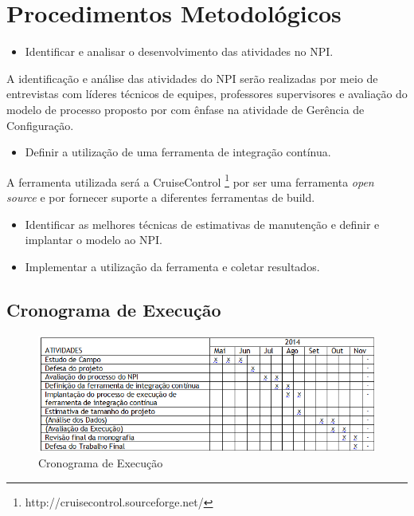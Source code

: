 \chapter{Procedimentos Metodológicos}\label{metodologia}

\begin{itemize}
\item Identificar e analisar o desenvolvimento das atividades no NPI.
\end{itemize}
A identificação e análise das atividades do NPI serão realizadas por meio de entrevistas com líderes técnicos de equipes, professores supervisores e avaliação do modelo de processo proposto por  com ênfase na atividade de Gerência de Configuração.

\begin{itemize}
\item Definir a utilização de uma ferramenta de integração contínua.
\end{itemize}
A ferramenta utilizada será a CruiseControl \footnote{http://cruisecontrol.sourceforge.net/} por ser uma ferramenta \textit{open source} e por fornecer suporte a diferentes ferramentas de build.

\begin{itemize}


\item Identificar as melhores técnicas de estimativas de manutenção e definir e implantar o modelo ao NPI.

\item Implementar a utilização da ferramenta e coletar resultados.
\end{itemize}






\section{Cronograma de Execução}
\begin{figure}[tbh]
\centering
\includegraphics[width=0.9\linewidth]{./images/cronograma}
\caption[Cronograma de Execução]{Cronograma de Execução}
\label{fig:Cronograma}
\end{figure}